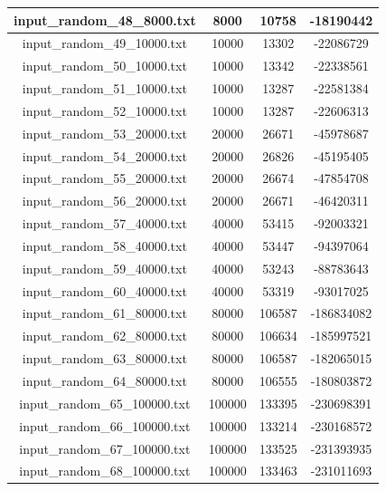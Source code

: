 \begin{longtable}{|c|c|c|c|}
	input\_random\_48\_8000.txt & 8000 & 10758 & -18190442 \\ \hline
	input\_random\_49\_10000.txt & 10000 & 13302 & -22086729 \\ \hline
	input\_random\_50\_10000.txt & 10000 & 13342 & -22338561 \\ \hline
	input\_random\_51\_10000.txt & 10000 & 13287 & -22581384 \\ \hline
	input\_random\_52\_10000.txt & 10000 & 13287 & -22606313 \\ \hline
	input\_random\_53\_20000.txt & 20000 & 26671 & -45978687 \\ \hline
	input\_random\_54\_20000.txt & 20000 & 26826 & -45195405 \\ \hline
	input\_random\_55\_20000.txt & 20000 & 26674 & -47854708 \\ \hline
	input\_random\_56\_20000.txt & 20000 & 26671 & -46420311 \\ \hline
	input\_random\_57\_40000.txt & 40000 & 53415 & -92003321 \\ \hline
	input\_random\_58\_40000.txt & 40000 & 53447 & -94397064 \\ \hline
	input\_random\_59\_40000.txt & 40000 & 53243 & -88783643 \\ \hline
	input\_random\_60\_40000.txt & 40000 & 53319 & -93017025 \\ \hline
	input\_random\_61\_80000.txt & 80000 & 106587 & -186834082 \\ \hline
	input\_random\_62\_80000.txt & 80000 & 106634 & -185997521 \\ \hline
	input\_random\_63\_80000.txt & 80000 & 106587 & -182065015 \\ \hline
	input\_random\_64\_80000.txt & 80000 & 106555 & -180803872 \\ \hline
	input\_random\_65\_100000.txt & 100000 & 133395 & -230698391 \\ \hline
	input\_random\_66\_100000.txt & 100000 & 133214 & -230168572 \\ \hline
	input\_random\_67\_100000.txt & 100000 & 133525 & -231393935 \\ \hline
	input\_random\_68\_100000.txt & 100000 & 133463 & -231011693 \\ \hline
	
\end{longtable}

